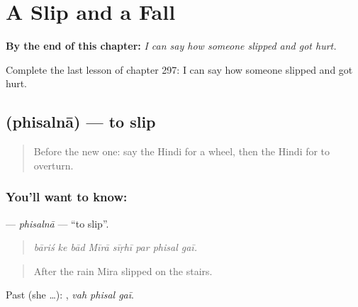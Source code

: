 
\chapter{A Slip and a Fall}
\label{ch:hi-a-slip-and-a-fall}

\begin{chapteropening}
\textbf{By the end of this chapter:} \emph{I can say how someone slipped and got hurt.}

Complete the last lesson of chapter 297: I can say how someone slipped and got hurt.
\end{chapteropening}

\section[\texorpdfstring{\hi{फिसलना} (phisalnā)}{फिसलना (phisalnā)}]{ (phisalnā) — to slip}

\label{lesson:HI-C297-phisalna}



\begin{quote}
Before the new one: say the Hindi for a wheel, then the Hindi for to overturn.
\end{quote}

\subsection*{You'll want to know: }
\textbf{} — \emph{phisalnā} — \textquotedblleft{}to slip\textquotedblright{}.

\begin{quote}
       
\end{quote}

\begin{quote}
\emph{bāriś ke bād Mīrā sīṛhī par phisal gaī.}
\end{quote}

\begin{quote}
After the rain Mira slipped on the stairs.
\end{quote}

Past (she …):   , \emph{vah phisal gaī}.

